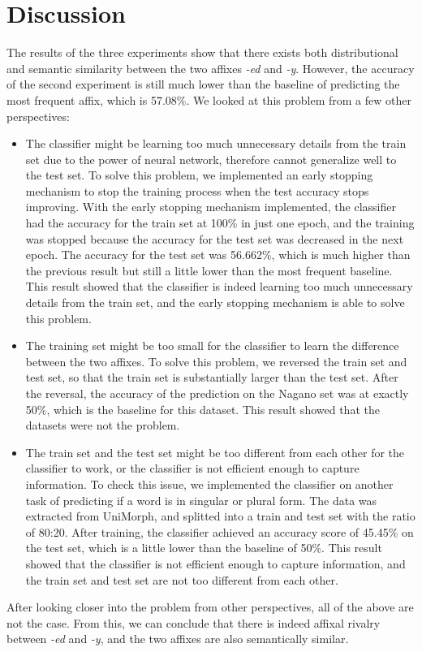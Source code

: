 \documentclass[12pt]{article}
\begin{document}
\section{Discussion}
    The results of the three experiments show that there exists both distributional and semantic similarity between the two affixes \emph{-ed} and \emph{-y}. However, the accuracy of the second experiment is still much lower than the baseline of predicting the most frequent affix, which is 57.08\%. We looked at this problem from a few other perspectives:
    \begin{itemize}
        \item The classifier might be learning too much unnecessary details from the train set due to the power of neural network, therefore cannot generalize well to the test set. To solve this problem, we implemented an early stopping mechanism to stop the training process when the test accuracy stops improving. With the early stopping mechanism implemented, the classifier had the accuracy for the train set at 100\% in just one epoch, and the training was stopped because the accuracy for the test set was decreased in the next epoch. The accuracy for the test set was 56.662\%, which is much higher than the previous result but still a little lower than the most frequent baseline. This result showed that the classifier is indeed learning too much unnecessary details from the train set, and the early stopping mechanism is able to solve this problem. 
        \item The training set might be too small for the classifier to learn the difference between the two affixes. To solve this problem, we reversed the train set and test set, so that the train set is substantially larger than the test set. After the reversal, the accuracy of the prediction on the Nagano set was at exactly 50\%, which is the baseline for this dataset. This result showed that the datasets were not the problem. 
        \item The train set and the test set might be too different from each other for the classifier to work, or the classifier is not efficient enough to capture information. To check this issue, we implemented the classifier on another task of predicting if a word is in singular or plural form. The data was extracted from UniMorph, and splitted into a train and test set with the ratio of 80:20. After training, the classifier achieved an accuracy score of 45.45\% on the test set, which is a little lower than the baseline of 50\%. This result showed that the classifier is not efficient enough to capture information, and the train set and test set are not too different from each other.
        
    \end{itemize}
    After looking closer into the problem from other perspectives, all of the above are not the case. From this, we can conclude that there is indeed affixal rivalry between \emph{-ed} and \emph{-y}, and the two affixes are also semantically similar.
\end{document}
